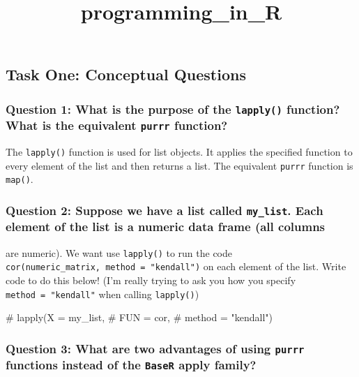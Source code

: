 \documentclass[
  letterpaper,
  DIV=11,
  numbers=noendperiod]{scrartcl}
\title{programming\_in\_R}
\author{}
\date{}
\newenvironment{Shaded}{\begin{snugshade}}{\end{snugshade}}
\newcommand{\CommentTok}[1]{\textcolor[rgb]{0.37,0.37,0.37}{#1}}
\begin{document}
\maketitle


\subsection{Task One: Conceptual
Questions}\label{task-one-conceptual-questions}

\subsubsection{\texorpdfstring{Question 1: What is the purpose of the
\texttt{lapply()} function? What is the equivalent \texttt{purrr}
function?}{Question 1: What is the purpose of the lapply() function? What is the equivalent purrr function?}}\label{question-1-what-is-the-purpose-of-the-lapply-function-what-is-the-equivalent-purrr-function}

The \texttt{lapply()} function is used for list objects. It applies the
specified function to every element of the list and then returns a list.
The equivalent \texttt{purrr} function is \texttt{map()}.

\subsubsection{\texorpdfstring{Question 2: Suppose we have a list called
\texttt{my\_list}. Each element of the list is a numeric data frame (all
columns}{Question 2: Suppose we have a list called my\_list. Each element of the list is a numeric data frame (all columns}}\label{question-2-suppose-we-have-a-list-called-my_list.-each-element-of-the-list-is-a-numeric-data-frame-all-columns}

are numeric). We want use \texttt{lapply()} to run the code
\texttt{cor(numeric\_matrix,\ method\ =\ "kendall")} on each element of
the list. Write code to do this below! (I'm really trying to ask you how
you specify \texttt{method\ =\ "kendall"} when calling
\texttt{lapply()})

\begin{Shaded}
\begin{Highlighting}[]
\CommentTok{\# lapply(X = my\_list, }
\CommentTok{\#        FUN = cor,}
\CommentTok{\#        method = "kendall")}
\end{Highlighting}
\end{Shaded}

\subsubsection{\texorpdfstring{Question 3: What are two advantages of
using \texttt{purrr} functions instead of the \texttt{BaseR} apply
family?}{Question 3: What are two advantages of using purrr functions instead of the BaseR apply family?}}\label{question-3-what-are-two-advantages-of-using-purrr-functions-instead-of-the-baser-apply-family}
\end{document}
